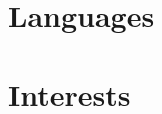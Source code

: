 \documentclass[12pt]{report} %
\begin{document}
\extracurricular{}



\section{Languages}

\languages{}



\section{Interests}

\interests{}


\end{document}
